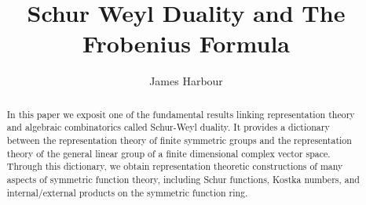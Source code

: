 \documentclass[12pt]{article}
\title{Schur Weyl Duality and The Frobenius Formula}
\author{James Harbour}
\begin{document}
\maketitle

\begin{abstract}
  In this paper we exposit one of the fundamental results linking representation theory and algebraic combinatorics called Schur-Weyl duality. It provides a dictionary between the representation theory of finite symmetric groups and the representation theory of the general linear group of a finite dimensional complex vector space. Through this dictionary, we obtain representation theoretic constructions of many aspects of symmetric function theory, including Schur functions, Kostka numbers, and internal/external products on the symmetric function ring.
\end{abstract}

\tableofcontents












\printbibliography
\end{document}
